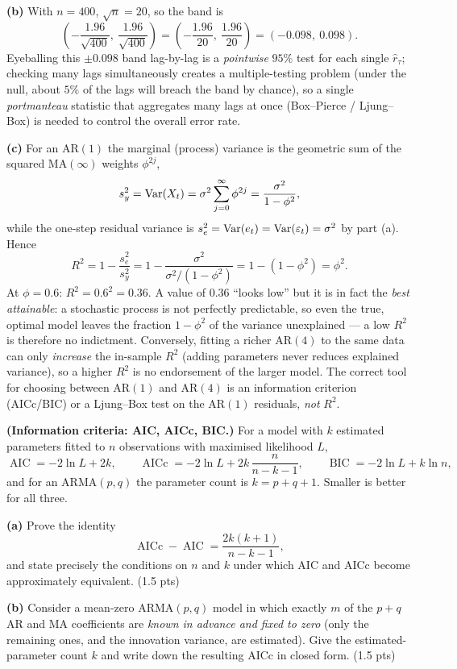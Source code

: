 \documentclass[11pt]{article}
\DeclareMathOperator{\AIC}{AIC}
\DeclareMathOperator{\AICc}{AICc}
\DeclareMathOperator{\BIC}{BIC}
\begin{document}
\textbf{(b)} With $n=400$, $\sqrt n=20$, so the band is
\[
\left(-\frac{1.96}{\sqrt{400}},\ \frac{1.96}{\sqrt{400}}\right)
=\left(-\frac{1.96}{20},\ \frac{1.96}{20}\right)
=(-0.098,\ 0.098).
\]
Eyeballing this $\pm0.098$ band lag-by-lag is a \emph{pointwise} $95\%$ test for each single $\hat r_\tau$; checking many lags simultaneously creates a multiple-testing problem (under the null, about $5\%$ of the lags will breach the band by chance), so a single \emph{portmanteau} statistic that aggregates many lags at once (Box--Pierce / Ljung--Box) is needed to control the overall error rate.

\textbf{(c)} For an AR$(1)$ the marginal (process) variance is the geometric sum of the squared $\mathrm{MA}(\infty)$ weights $\phi^{2j}$,
\[
s_y^2=\operatorname{Var}(X_t)=\sigma^2\sum_{j=0}^\infty\phi^{2j}=\frac{\sigma^2}{1-\phi^2},
\]
while the one-step residual variance is $s_e^2=\operatorname{Var}(e_t)=\operatorname{Var}(\varepsilon_t)=\sigma^2$ by part (a). Hence
\[
R^2=1-\frac{s_e^2}{s_y^2}
=1-\frac{\sigma^2}{\sigma^2/(1-\phi^2)}
=1-(1-\phi^2)=\phi^2 .
\]
At $\phi=0.6$: $\boxed{R^2=0.6^2=0.36}$. A value of $0.36$ ``looks low'' but it is in fact the \emph{best attainable}: a stochastic process is not perfectly predictable, so even the true, optimal model leaves the fraction $1-\phi^2$ of the variance unexplained --- a low $R^2$ is therefore no indictment. Conversely, fitting a richer AR$(4)$ to the same data can only \emph{increase} the in-sample $R^2$ (adding parameters never reduces explained variance), so a higher $R^2$ is no endorsement of the larger model. The correct tool for choosing between AR$(1)$ and AR$(4)$ is an information criterion (AICc/BIC) or a Ljung--Box test on the AR$(1)$ residuals, \emph{not} $R^2$.

\statementstart
\textbf{(Information criteria: AIC, AICc, BIC.)} For a model with $k$ estimated parameters fitted to $n$ observations with maximised likelihood $L$,
\[
\AIC=-2\ln L+2k,\qquad
\AICc=-2\ln L+2k\,\frac{n}{n-k-1},\qquad
\BIC=-2\ln L+k\ln n,
\]
and for an ARMA$(p,q)$ the parameter count is $k=p+q+1$. Smaller is better for all three.

\textbf{(a)} Prove the identity
\[
\AICc-\AIC=\frac{2k(k+1)}{n-k-1},
\]
and state precisely the conditions on $n$ and $k$ under which AIC and AICc become approximately equivalent. \hfill(1.5 pts)

\textbf{(b)} Consider a mean-zero ARMA$(p,q)$ model in which exactly $m$ of the $p+q$ AR and MA coefficients are \emph{known in advance and fixed to zero} (only the remaining ones, and the innovation variance, are estimated). Give the estimated-parameter count $k$ and write down the resulting AICc in closed form. \hfill(1.5 pts)
\end{document}
